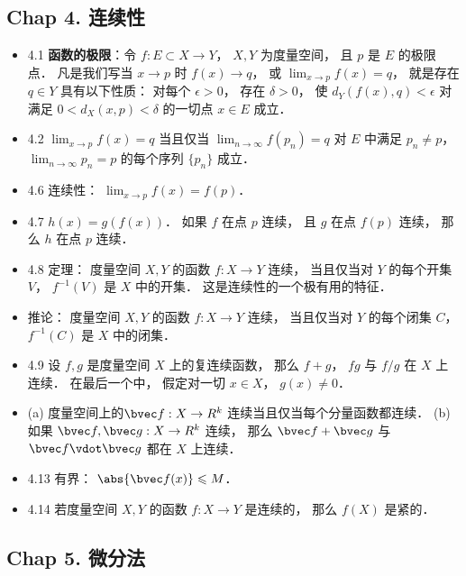 
\subsection{Chap 4. 连续性}

\begin{itemize}
\item 4.1 \textbf{函数的极限}：令 $f:E\subset X\to Y$， $X,Y$ 为度量空间， 且 $p$ 是 $E$ 的极限点． 凡是我们写当 $x\to p$ 时 $f(x)\to q$， 或 $\lim_{x\to p}f(x)=q$， 就是存在 $q\in Y$ 具有以下性质： 对每个 $\epsilon>0$， 存在 $\delta>0$， 使 $d_{Y}(f(x),q)<\epsilon$ 对满足 $0<d_X(x,p)<\delta$ 的一切点 $x\in E$ 成立．

\item 4.2 $\lim_{x\to p}f(x)=q$ 当且仅当 $\lim_{n\to\infty} f(p_n)=q$ 对 $E$ 中满足 $p_n\ne p$， $\lim_{n\to\infty} p_n=p$ 的每个序列 $\{p_n\}$ 成立．

\item 4.6 连续性： $\lim_{x\to p}f(x)=f(p)$．

\item 4.7 $h(x) = g(f(x))$． 如果 $f$ 在点 $p$ 连续， 且 $g$ 在点 $f(p)$ 连续， 那么 $h$ 在点 $p$ 连续．

\item 4.8 定理： 度量空间 $X,Y$ 的函数 $f:X\to Y$ 连续， 当且仅当对 $Y$ 的每个开集 $V$， $f^{-1}(V)$ 是 $X$ 中的开集． 这是连续性的一个极有用的特征．

\item 推论： 度量空间 $X,Y$ 的函数 $f:X\to Y$ 连续， 当且仅当对 $Y$ 的每个闭集 $C$， $f^{-1}(C)$ 是 $X$ 中的闭集．

\item 4.9 设 $f,g$ 是度量空间 $X$ 上的复连续函数， 那么 $f+g$， $fg$ 与 $f/g$ 在 $X$ 上连续． 在最后一个中， 假定对一切 $x\in X$， $g(x)\ne 0$．

\item (a) 度量空间上的$\bvec f:X\to R^k$ 连续当且仅当每个分量函数都连续． (b) 如果 $\bvec f, \bvec g:X\to R^k$ 连续， 那么 $\bvec f+\bvec g$ 与 $\bvec f\vdot \bvec g$ 都在 $X$ 上连续．

\item 4.13 有界： $\abs{\bvec f(x)}\leqslant M$．

\item 4.14 若度量空间 $X,Y$ 的函数 $f:X\to Y$ 是连续的， 那么 $f(X)$ 是紧的．
\end{itemize}


\subsection{Chap 5. 微分法}

